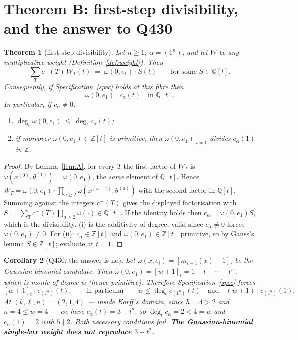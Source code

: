 \documentclass[11pt]{article}
\theoremstyle{plain}
\newtheorem{theorem}{Theorem}
\newtheorem{corollary}[theorem]{Corollary}
\theoremstyle{definition}
\theoremstyle{remark}
\newcommand{\cm}{c^{-}}
\newcommand{\qbin}[1]{[#1]_t}
\begin{document}
\section{Theorem B: first-step divisibility, and the answer to Q430}

\begin{theorem}[first-step divisibility]\label{thm:B}
Let $n\geq1$, $\alpha=(1^n)$, and let $W$ be any multiplicative weight
(Definition~\ref{def:weight}). Then
\[
\sum_{T}\cm(T)\,W_T(t)\;=\;\omega(0,e_1)\cdot S(t)\qquad\text{for some }S\in\mathbb{Q}[t].
\]
Consequently, if Specification~\ref{spec} holds at this fibre then
\[
\boxed{\ \omega(0,e_1)\ \big|\ c_\alpha(t)\quad\text{in }\mathbb{Q}[t].\ }
\]
In particular, if $c_\alpha\neq0$:
\begin{enumerate}
\item[(i)] $\deg_t\omega(0,e_1)\ \leq\ \deg_t c_\alpha(t)$;
\item[(ii)] if moreover $\omega(0,e_1)\in\mathbb{Z}[t]$ is primitive, then
$\omega(0,e_1)\big|_{t=1}$ divides $c_\alpha(1)$ in $\mathbb{Z}$.
\end{enumerate}
\end{theorem}

\begin{proof}
By Lemma~\ref{lem:A}, for every $T$ the first factor of $W_T$ is
$\omega(x^{(0)},\theta^{(1)})=\omega(0,e_1)$, the \emph{same} element of $\mathbb{Q}[t]$.
Hence $W_T=\omega(0,e_1)\cdot\prod_{a\geq2}\omega(x^{(a-1)},\theta^{(a)})$ with the second
factor in $\mathbb{Q}[t]$. Summing against the integers $\cm(T)$ gives the displayed
factorisation with $S:=\sum_T\cm(T)\prod_{a\geq2}\omega(\cdot)\in\mathbb{Q}[t]$.
If the identity holds then $c_\alpha=\omega(0,e_1)S$, which is the divisibility.
(i) is the additivity of degree, valid since $c_\alpha\neq0$ forces $\omega(0,e_1)\neq0$.
For (ii): $c_\alpha\in\mathbb{Z}[t]$ and $\omega(0,e_1)\in\mathbb{Z}[t]$ primitive, so by
Gauss's lemma $S\in\mathbb{Z}[t]$; evaluate at $t=1$.
\end{proof}

\begin{corollary}[Q430: the answer is no]\label{cor:q430}
Let $\omega(x,e_i)=\qbin{m_{i-1}(x)+1}$ be the Gaussian-binomial candidate. Then
$\omega(0,e_1)=\qbin{w+1}=1+t+\cdots+t^{w}$, which is monic of degree $w$ (hence
primitive). Therefore Specification~\ref{spec} forces
\[
\qbin{w+1}\ \big|\ c_{(1^n)}(t),\qquad\text{in particular}\qquad
w\leq \deg_t c_{(1^n)}(t)\quad\text{and}\quad (w+1)\ \big|\ c_{(1^n)}(1).
\]
At $(k,\ell,n)=(2,1,4)$ --- inside Korff's domain, since $h=4>2$ and $n=4\leq w=4$ --- we
have $c_\alpha(t)=3-t^2$, so $\deg_t c_\alpha=2<4=w$ and $c_\alpha(1)=2$ with
$5\nmid2$. Both necessary conditions fail. \textbf{The Gaussian-binomial single-box weight
does not reproduce $3-t^2$.}
\end{corollary}
\end{document}
